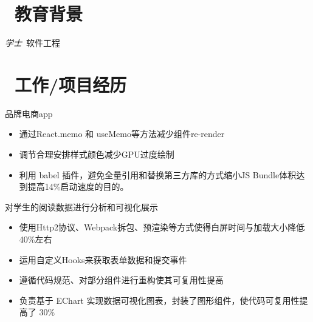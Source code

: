 \documentclass{resume}
\begin{document}


 
\section{\faGraduationCap\  教育背景}
\textit{学士}\ 软件工程

\section{\faUsers\ 工作/项目经历}
\role{工作}{前端***}
品牌电商app
\begin{itemize}
  \item 通过React.memo 和 useMemo等方法减少组件re-render
  \item 调节合理安排样式颜色减少GPU过度绘制
  \item 利用 babel 插件，避免全量引用和替换第三方库的方式缩小JS Bundle体积达到提高14\%启动速度的目的。
\end{itemize}


\begin{onehalfspacing}
对学生的阅读数据进行分析和可视化展示
\begin{itemize}
  \item 使⽤Http2协议、Webpack拆包、预渲染等方式使得⽩屏时间与加载⼤⼩降低40\%左右
  \item 运⽤⾃定义Hooks来获取表单数据和提交事件
  \item 遵循代码规范、对部分组件进行重构使其可复用性提高
  \item 负责基于 EChart 实现数据可视化图表，封装了图形组件，使代码可复用性提高了 30\%
\end{itemize}
\end{onehalfspacing}
\end{document}
